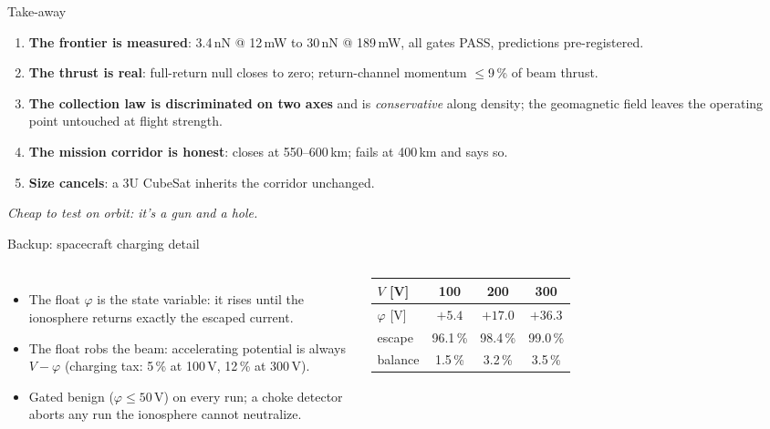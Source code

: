 \documentclass[10pt,aspectratio=169]{beamer}
\begin{document}
\begin{frame}{Take-away}
  \begin{enumerate}
    \item \textbf{The frontier is measured}: 3.4\,nN @ 12\,mW to
          30\,nN @ 189\,mW, all gates PASS, predictions
          pre-registered.
    \item \textbf{The thrust is real}: full-return null closes to
          zero; return-channel momentum $\le$9\,\% of beam thrust.
    \item \textbf{The collection law is discriminated on two axes}
          and is \emph{conservative} along density; the geomagnetic
          field leaves the operating point untouched at flight
          strength.
    \item \textbf{The mission corridor is honest}: closes at
          550--600\,km; fails at 400\,km and says so.
    \item \textbf{Size cancels}: a 3U CubeSat inherits the corridor
          unchanged.
  \end{enumerate}
  \vspace{2ex}
  \centering
  \large\emph{Cheap to test on orbit: it's a gun and a hole.}
\end{frame}

\appendix

\begin{frame}{Backup: spacecraft charging detail}
  \begin{columns}
      \begin{itemize}\small
        \item The float $\varphi$ is the state variable: it rises
              until the ionosphere returns exactly the escaped
              current.
        \item The float robs the beam: accelerating potential is
              always $V - \varphi$ (charging tax: 5\,\% at 100\,V,
              12\,\% at 300\,V).
        \item Gated benign ($\varphi \le 50$\,V) on every run; a
              choke detector aborts any run the ionosphere cannot
              neutralize.
      \end{itemize}
      \centering
      \begin{tabular}{lccc}
        \toprule
        $V$ [V] & 100 & 200 & 300 \\
        \midrule
        $\varphi$ [V] & $+5.4$ & $+17.0$ & $+36.3$ \\
        escape & 96.1\,\% & 98.4\,\% & 99.0\,\% \\
        balance & 1.5\,\% & 3.2\,\% & 3.5\,\% \\
        \bottomrule
      \end{tabular}
  \end{columns}
\end{frame}
\end{document}
